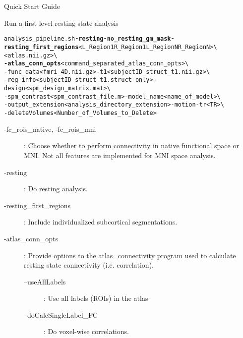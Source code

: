 \documentclass[]{report}
\begin{document}
\begin{chapter}{Quick Start Guide }
\begin{section}{Run a first level resting state analysis}
\
\begin{alltt}
analysis\_pipeline.sh  {\bf-resting  -no_resting_gm_mask -resting\_first\_regions } <L_Region1 R_Region1 L_RegionN R_RegionN>  \textbackslash \\
\hspace*{0.5in}  \left[ \bf-fc\_rois\_native, -fc\_rois\_mni \right]  <atlas.nii.gz>  \textbackslash \\
\hspace*{0.5in}  {\bf -atlas\_conn\_opts } <command\_separated\_atlas\_conn\_opts>  \textbackslash \\
\hspace*{0.5in}  -func\_data <fmri\_4D.nii.gz>   -t1 <subjectID\_struct\_t1.nii.gz>  \textbackslash \\
\hspace*{0.5in} -reg\_info <subjectID\_struct\_t1.struct\_only> -design <spm\_design\_matrix.mat> \textbackslash  \\
\hspace*{0.5in} -spm\_contrast  <spm\_contrast\_file.m> -model\_name <name\_of\_model> \textbackslash   \\
\hspace*{0.5in} -output\_extension <analysis\_directory\_extension>  -motion -tr <TR> \textbackslash  \\
\hspace*{0.5in} -deleteVolumes <Number\_of\_Volumes\_to\_Delete>
\end{alltt}
\begin{description}
	\item [-fc\_rois\_native, -fc\_rois\_mni  ]  : Choose whether to perform connectivity in native functional space or MNI. Not all features are implemented for MNI space analysis.
	\item [-resting] :  Do resting analysis.
	\item [-resting\_first\_regions ] : Include individualized subcortical segmentations.
	\item [ -atlas\_conn\_opts] : Provide options to the atlas_connectivity program used to calculate resting state connectivity (i.e. correlation).
	\begin{description}
	\item [--useAllLabels  ]  : Use all labels (ROIs) in the atlas
	\item [--doCalcSingleLabel\_FC] :  Do voxel-wise correlations.
	\end{description}


\end{description}
\end{section}
\end{chapter}
\end{document}
